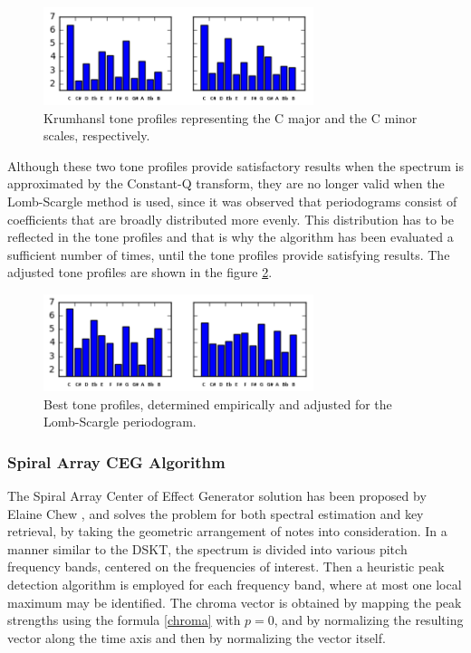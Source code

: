 \documentclass[letterpaper]{article}
\begin{document}
\begin{figure}
\begin{center}
\includegraphics[width=3.1in,angle=0]{imgs/Krumhansl.png}
\caption{Krumhansl tone profiles representing the C major and the C minor scales, respectively.}
\label{krumhansl}
\end{center}
\end{figure}

Although these two tone profiles provide satisfactory results when the spectrum is approximated by the Constant-Q transform, they are no longer valid 
when the Lomb-Scargle method is used, since it was observed that periodograms consist of coefficients that are broadly distributed more evenly. This distribution has to be reflected in the tone profiles and that is why the algorithm has been evaluated a sufficient number of times, until the tone profiles
provide satisfying results. The adjusted tone profiles are shown in the figure \ref{profiles}.

\begin{figure}
\begin{center}
\includegraphics[width=3.1in,angle=0]{imgs/Custom.png}
\caption{Best tone profiles, determined empirically and adjusted for the Lomb-Scargle periodogram.}
\label{profiles}
\end{center}
\end{figure}

\subsubsection{Spiral Array CEG Algorithm}

The Spiral Array Center of Effect Generator solution has been proposed by Elaine Chew \citep{SPIRAL}, and solves the problem for both spectral estimation and key retrieval, by taking the geometric arrangement of notes into consideration.
In a manner similar to the DSKT, the spectrum is divided into various pitch frequency bands, centered on the frequencies of interest. Then a heuristic peak detection algorithm is employed for each frequency band, where 
at most one local maximum may be identified. The chroma vector is obtained by mapping the peak strengths using the formula \ref{chroma} with $p = 0$, and by normalizing the resulting vector along the time axis and then by normalizing the vector itself.\\
\end{document}

